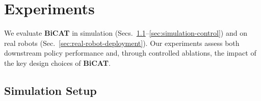 \section{Experiments}
\label{sec:experiments}

We evaluate \textbf{BiCAT} in simulation
(Secs.~\ref{sec:benchmark-and-baselines}--\ref{sec:simulation-control}) and on
real robots (Sec.~\ref{sec:real-robot-deployment}). Our experiments
assess both downstream policy performance and, through controlled
ablations, the impact of the key design choices of \textbf{BiCAT}.

\subsection{Simulation Setup}
\label{sec:benchmark-and-baselines}
\label{sec:training-protocol}

